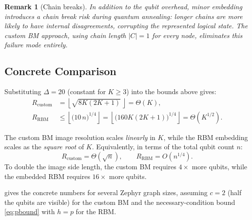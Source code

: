 \documentclass[11pt,a4paper]{article}
\newtheorem{remark}{Remark}
\begin{document}
\begin{remark}[Chain breaks]
In addition to the qubit overhead, minor embedding introduces a \emph{chain break} risk during quantum annealing: longer chains are more likely to have internal disagreements, corrupting the represented logical state.  The custom BM approach, using chain length $|C|=1$ for every node, eliminates this failure mode entirely.
\end{remark}

\subsection{Concrete Comparison}\label{sec:concrete}

Substituting $\Delta = 20$ (constant for $K\geq 3$) into the bounds above gives:
\begin{align}
  R_{\mathrm{custom}} &= \left\lfloor\sqrt{8K(2K+1)}\,\right\rfloor = \Theta(K), \label{eq:Rcust}\\
  R_{\mathrm{RBM}}    &\leq \left\lfloor\bigl(10\,n\bigr)^{1/4}\right\rfloor = \left\lfloor\bigl(160K(2K+1)\bigr)^{1/4}\right\rfloor = \Theta\!\left(K^{1/2}\right). \label{eq:Rrbm}
\end{align}

The custom BM image resolution scales \emph{linearly} in $K$, while the RBM embedding scales as the \emph{square root} of $K$.  Equivalently, in terms of the total qubit count $n$:
\begin{equation}\label{eq:scaling}
  \boxed{R_{\mathrm{custom}} = \Theta\!\left(\sqrt{n}\right), \qquad R_{\mathrm{RBM}} = O\!\left(n^{1/4}\right).}
\end{equation}
To double the image side length, the custom BM requires $4\times$ more qubits, while the embedded RBM requires $16\times$ more qubits.

 gives the concrete numbers for several Zephyr graph sizes, assuming $c=2$ (half the qubits are visible) for the custom BM and the necessary-condition bound \eqref{eq:pbound} with $h=p$ for the RBM.
\end{document}
